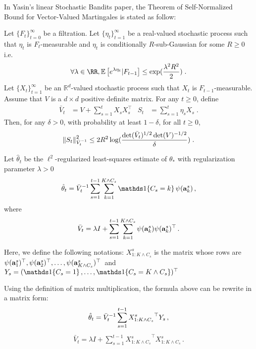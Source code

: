 In Yasin's linear Stochastic Bandits paper, the Theorem of Self-Normalized Bound for Vector-Valued Martingales is stated as follow:
\begin{theorem}
\label{theorem:martingale-bound}
Let $\{F_t\}_{t=0}^\infty$ be a filtration. Let $\{\eta_t\}_{t=1}^\infty$ be a real-valued stochastic process such that $\eta_t$
is $F_t$-measurable and $\eta_t$ is conditionally $R$-sub-Gaussian for some $R \ge 0$ i.e.
\begin{align*}
\forall \lambda \in \RR , \EE{e^{\lambda \eta_t} | F_{t-1}} \le \exp( \frac{\lambda^2R^2}{2}) \; .
\end{align*}
Let $\{X_t\}_{t=1}^\infty$ be an $\mathbb{R}^d$-valued stochastic process such that $X_t$ is $F_{t-1}$-measurable.
Assume that $V$ is a $d \times d$ positive definite matrix. For any $t \ge 0$, define
\begin{align*}
\bar{V}_t &= V + \sum_{s=1}^t X_s X_s^\top
&
S_t &= \sum_{s=1}^t \eta_s X_s \; .
\end{align*}
Then, for any $\delta > 0$, with probability at least $1-\delta$, for all $t \ge 0$,
$$
\left\|S_t\right\|_{\bar{V}_t^{-1}}^2
\le
2 R^2 \log( \frac{\det (\bar{V}_t)^{1/2} \det(V)^{-1/2}}{\delta} ) \; .
$$
\end{theorem}


Let $\hat{\theta}_t$ be the $\ell^2$-regularized least-squares estimate of $\theta_*$ with regularization parameter $\lambda > 0$
\begin{align*}
  \hat{\rnd{\theta}}_t = \bar{V}_t^{-1} \sum_{s=1}^{t-1} \sum_{k=1}^{K \wedge C_s}
  \I{C_s=k} \psi(\rnd{a}^s_k)\,,
\end{align*}
where
\[
\bar{V}_t = \lambda I + \sum_{s=1}^{t-1} \sum_{k=1}^{K \wedge C_s}
\psi(\mathbf{a}^s_k) \psi(\mathbf{a}^s_k)^\top\,.
\]

Here, we define the following notations:
$X^s_{1 : K \wedge C_s}$ is the matrix whose rows are
$\psi(\mathbf{a}^s_1)^\top, \psi(\mathbf{a}^s_2)^\top, \dots, \psi(\mathbf{a}^s_{ K \wedge C_s})^\top \,$ and
$Y_s = (\I{C_s=1}, \dots, \I{C_s= K \wedge C_s})^\top\,$

Using the definition of matrix multiplication, the formula above can be rewrite in a matrix form:
\begin{align*}
  \hat{\mathbf{\theta}}_t = \bar{V}_t^{-1} \sum_{s=1}^{t-1} {X^s_{1 : K \wedge C_s}}^\top Y_s \,,
\end{align*}
\begin{align*}
\bar{V}_t = \lambda I + \sum_{s=1}^{t-1} {X^s_{1 : K \wedge C_s}}^\top X^s_{1 : K \wedge C_s} \,.
\end{align*}

